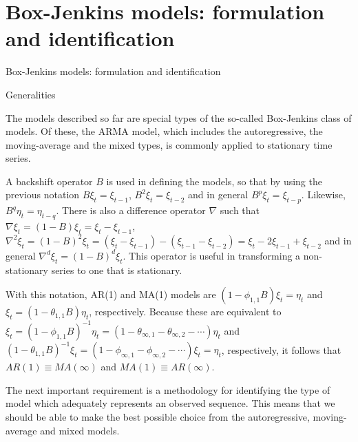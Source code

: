 \documentclass[8pt]{beamer}
\renewcommand{\emph}[1]{\textcolor{myorange}{#1}}
\begin{document}
\section{Box-Jenkins models: formulation and identification}
\begin{frame}{Box-Jenkins models: formulation and identification}
    \begin{block}{Generalities}
    \end{block}
    The models described so far are special types of the so-called \alert{Box-Jenkins class of models}. Of these, the \alert{ARMA} model, which includes the \emph{autoregressive}, the \emph{moving-average} and the mixed types, is commonly applied to \emph{stationary} time series.

    A \emph{backshift} operator $B$ is used in defining the models, so that by using the previous notation $B\xi_t = \xi_{t-1}$, $B^2 \xi_t = \xi_{t-2}$ and in general $B^p \xi_t = \xi_{t-p}$. Likewise, $B^q \eta_t = \eta_{t-q}$. There is also a difference operator $\nabla$ such that $\nabla \xi_t = (1-B)\xi_t = \xi_t - \xi_{t-1}$, $\nabla^2 \xi_t = (1-B)^2 \xi_t = (\xi_t - \xi_{t-1})-(\xi_{t-1}-\xi_{t-2}) = \xi_t - 2 \xi_{t-1} + \xi_{t-2}$ and in general $\nabla^d \xi_t = (1-B)^d \xi_t$. This operator is useful in transforming a \emph{non-stationary} series  to one that is \emph{stationary}.  

    With this notation, \emph{AR(1)} and \emph{MA(1)} models are $(1-\phi_{1,1}B)\xi_t = \eta_t$ and $\xi_t = (1-\theta_{1,1}B)\eta_t$, respectively. Because these are equivalent to $\xi_t = (1-\phi_{1,1}B)^{-1} \eta_t = (1-\theta_{\infty,1} - \theta_{\infty,2} - \cdots)\eta_t$ and $(1-\theta_{1,1}B)^{-1} \xi_t = (1-\phi_{\infty,1} - \phi_{\infty,2} - \cdots)\xi_t = \eta_t$, respectively, it follows that $AR(1)\equiv MA(\infty)$ and $MA(1) \equiv AR(\infty)$. 

    The next important requirement is a methodology for identifying the type of model which adequately represents an observed sequence. This means that we should be able to make the best possible choice from the \emph{autoregressive}, \emph{moving-average} and \emph{mixed } models. 
    
\end{frame}
\end{document}

